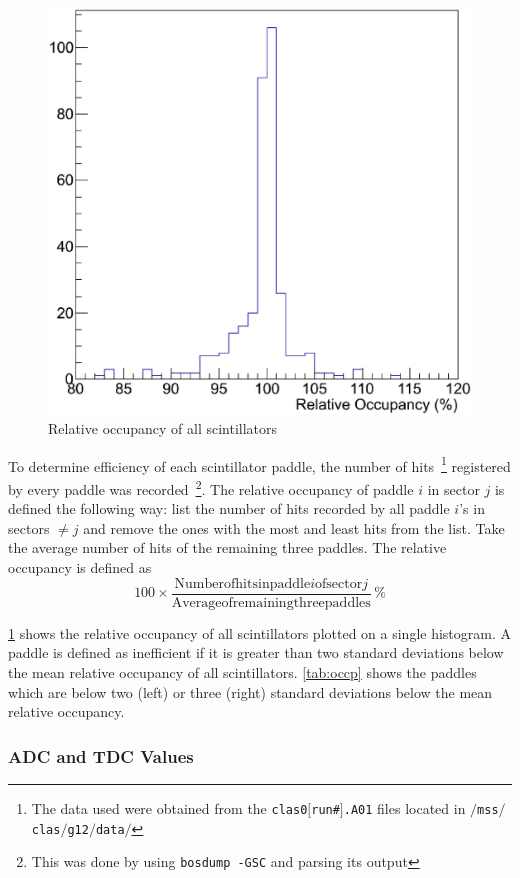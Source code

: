 
\begin{figure}\begin{center}
    \includegraphics[trim=0 40 10 40,clip,width=.40\linewidth]{figures/calib/tof/tofko/occp.eps}
    \caption{Relative occupancy of all scintillators}
    \label{plt:occp}
\end{center}\end{figure}

To determine efficiency of each scintillator paddle, the number of hits~\footnote{The data used were obtained from the \texttt{clas\underline{\hspace{5pt}}0$[$run\#$]$.A01} files located in \texttt{$/$mss$/$clas$/$g12$/$data$/$}} registered by every paddle was recorded~\footnote{This was done by using \texttt{bosdump -GSC} and parsing its output}. The relative occupancy of paddle $i$ in sector $j$ is defined the following way: list the number of hits recorded by all paddle $i$'s in sectors $\neq j$ and remove the ones with the most and least hits from the list. Take the average number of hits of the remaining three paddles. The relative occupancy is defined as
\[
100 \times \frac{ \mathrm{Number of hits in paddle } i \mathrm{ of sector } j}{\mathrm{Average of remaining three paddles}} \hspace{2pt}\%
\]

\ref{plt:occp} shows the relative occupancy of all scintillators plotted on a single histogram. A paddle is defined as inefficient if it is greater than two standard deviations below the mean relative occupancy of all scintillators. \ref{tab:occp} shows the paddles which are below two (left) or three (right) standard deviations below the mean relative occupancy.


\subsubsection{ADC and TDC Values}

